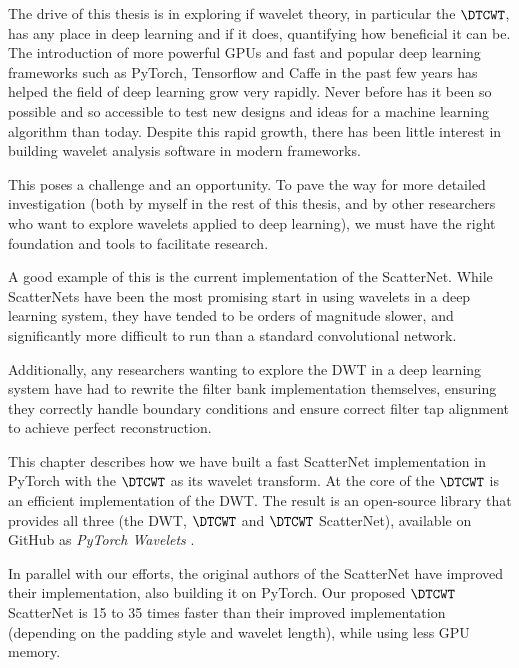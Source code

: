 The drive of this thesis is in exploring if wavelet theory, in
particular the $\DTCWT$, has any place in deep learning and if it does,
quantifying how beneficial it can be. The introduction of more powerful GPUs and
fast and popular deep learning frameworks such as PyTorch, Tensorflow and Caffe
in the past few years has helped the field of deep learning grow very rapidly.
Never before has it been so possible and so accessible to test new designs and
ideas for a machine learning algorithm than today. Despite this rapid growth,
there has been little interest in building wavelet analysis software in modern
frameworks. 

This poses a challenge and an opportunity. To pave the way for more detailed 
investigation (both by myself in the rest of this thesis, and by other researchers
who want to explore wavelets applied to deep learning), we must have the right
foundation and tools to facilitate research.

A good example of this is the current implementation of the ScatterNet. While
ScatterNets have been the most promising start in using wavelets in a deep
learning system, they have tended to be orders of magnitude slower, and significantly more
difficult to run than a standard convolutional network. 

Additionally, any researchers wanting to explore the DWT in a deep learning
system have had to rewrite the filter bank implementation themselves, ensuring they
correctly handle boundary conditions and ensure correct filter tap alignment to
achieve perfect reconstruction.

This chapter describes how we have built a fast ScatterNet implementation in 
PyTorch with the $\DTCWT$ as its wavelet transform. At the core of the $\DTCWT$ is an efficient 
implementation of the DWT\@. The result is an open-source library that provides
all three (the DWT, $\DTCWT$ and $\DTCWT$ ScatterNet), available on GitHub as
\emph{PyTorch Wavelets} \cite{cotter_pytorch_2018}.

In parallel with our efforts, the original authors of the ScatterNet have
improved their implementation, also building it on PyTorch. Our proposed
$\DTCWT$ ScatterNet is 15 to 35 times faster than their improved implementation
(depending on the padding style and wavelet length), while using less GPU memory. 
